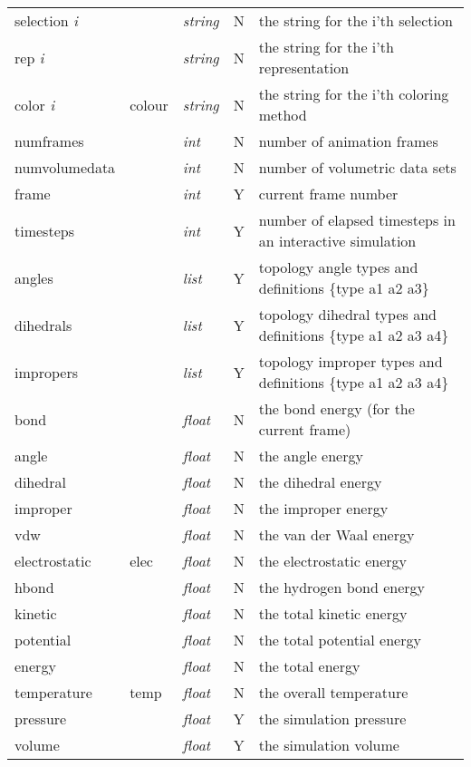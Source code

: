 \begin{table}[htp]
\begin{tabular}{|l|l|l|l|l|}
selection {\it i} & & {\it string} & N & the string for the i'th selection \\
rep {\it i} & & {\it string} & N & the string for the i'th representation \\
color {\it i} & colour & {\it string} & N & the string for the i'th coloring method \\
numframes & & {\it int} & N & number of animation frames         \\
numvolumedata & & {\it int} & N & number of volumetric data sets \\
frame & & {\it int} & Y & current frame number                   \\
timesteps & & {\it int} & Y & number of elapsed timesteps in an interactive simulation\\
angles & & {\it list} & Y & topology angle types and definitions \{type a1 a2 a3\}  \\
dihedrals & & {\it list} & Y & topology dihedral types and definitions \{type a1 a2 a3 a4\}  \\
impropers & & {\it list} & Y & topology improper types and definitions \{type a1 a2 a3 a4\}  \\
bond & & {\it float} & N & the bond energy (for the current frame)      \\
angle & & {\it float} & N & the angle energy                    \\
dihedral & & {\it float} & N & the dihedral energy              \\
improper & & {\it float} & N & the improper energy              \\
vdw & & {\it float} & N & the van der Waal energy               \\
electrostatic & elec & {\it float} & N & the electrostatic energy \\
hbond & & {\it float} & N & the hydrogen bond energy            \\
kinetic & & {\it float} & N & the total kinetic energy          \\
potential & & {\it float} & N & the total potential energy      \\
energy & & {\it float} & N & the total energy                   \\
temperature & temp & {\it float} & N & the overall temperature  \\
pressure & & {\it float} & Y & the simulation pressure          \\
volume & & {\it float} & Y & the simulation volume              \\

\end{tabular}
\end{table}
